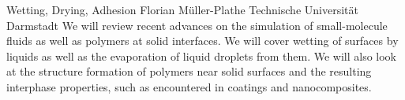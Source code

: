 
    \begin{abstract_online}{Wetting, Drying, Adhesion}{%
        Florian Müller-Plathe}{%
        \KLtag}{%
        Technische Universität Darmstadt}
    We will review recent advances on the simulation of small-molecule  fluids as well as polymers at solid interfaces. We will cover wetting of surfaces by liquids as well as the evaporation of liquid droplets from  them. We will also look at the structure formation of polymers near  solid surfaces and the resulting interphase properties, such as  encountered in coatings and nanocomposites.  
    
    \end{abstract_online}
    